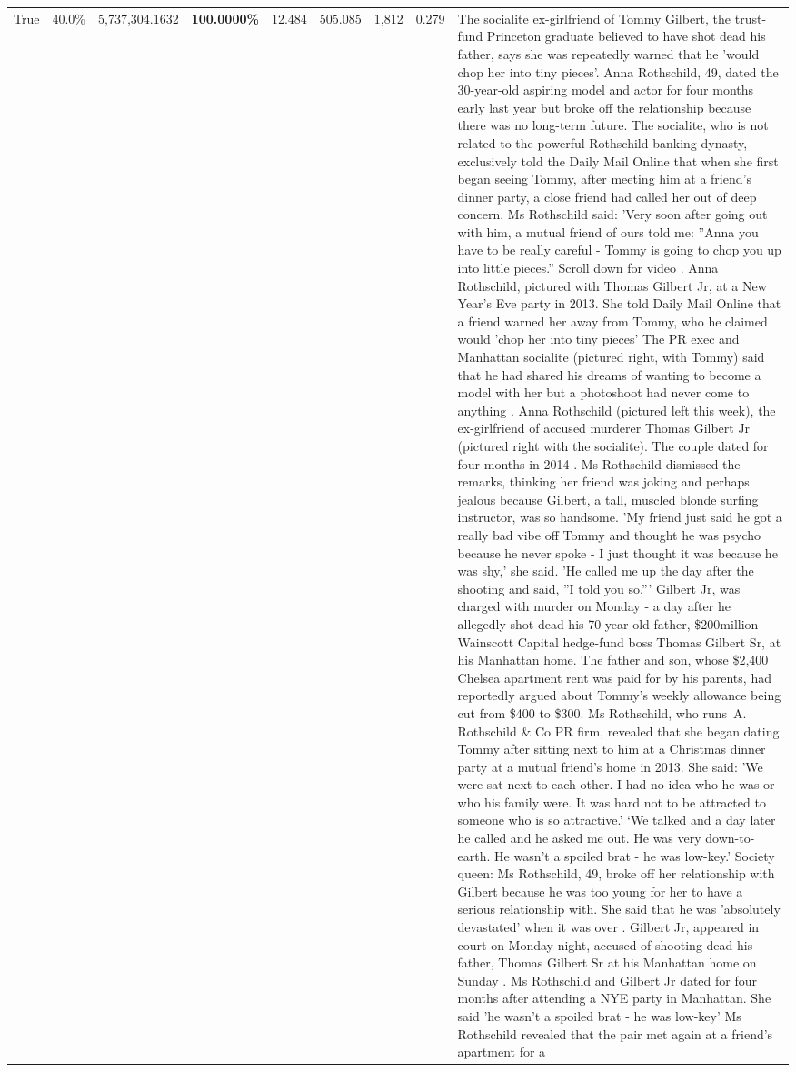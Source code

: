 \begin{table}[H]
\begin{tabular}{lllrlllll}
True & 40.0\% & 5,737,304.1632 & \bfseries \color{red} 100.0000\% & 12.484 & 505.085 & 1,812 & 0.279 & The socialite ex-girlfriend of Tommy Gilbert, the trust-fund Princeton graduate believed to have shot dead his father, says she was repeatedly warned that he 'would chop her into tiny pieces'. Anna Rothschild, 49, dated the 30-year-old aspiring model and actor for four months early last year but broke off the relationship because there was no long-term future. The socialite, who is not related to the powerful Rothschild banking dynasty, exclusively told the Daily Mail Online that when she first began seeing Tommy, after meeting him at a friend's dinner party, a close friend had called her out of deep concern. Ms Rothschild said: 'Very soon after going out with him, a mutual friend of ours told me: ''Anna you have to be really careful - Tommy is going to chop you up into little pieces.'' Scroll down for video . Anna Rothschild, pictured with Thomas Gilbert Jr, at a New Year's Eve party in 2013. She told Daily Mail Online that a friend warned her away from Tommy, who he claimed would 'chop her into tiny pieces' The PR exec and Manhattan socialite (pictured right, with Tommy) said that he had shared his dreams of wanting to become a model with her but a photoshoot had never come to anything . Anna Rothschild (pictured left this week), the ex-girlfriend of accused murderer Thomas Gilbert Jr (pictured right with the socialite). The couple dated for four months in 2014 . Ms Rothschild dismissed the remarks, thinking her friend was joking and perhaps jealous because Gilbert, a tall, muscled blonde surfing instructor, was so handsome. 'My friend just said he got a really bad vibe off Tommy and thought he was psycho because he never spoke - I just thought it was because he was shy,' she said. 'He called me up the day after the shooting and said, ''I told you so.''' Gilbert Jr, was charged with murder on Monday - a day after he allegedly shot dead his 70-year-old father, \$200million Wainscott Capital hedge-fund boss Thomas Gilbert Sr, at his Manhattan home. The father and son, whose \$2,400 Chelsea apartment rent was paid for by his parents, had reportedly argued about Tommy's weekly allowance being cut from \$400 to \$300. Ms Rothschild, who runs A. Rothschild \& Co PR firm, revealed that she began dating Tommy after sitting next to him at a Christmas dinner party at a mutual friend's home in 2013. She said: 'We were sat next to each other. I had no idea who he was or who his family were. It was hard not to be attracted to someone who is so attractive.' ‘We talked and a day later he called and he asked me out. He was very down-to-earth. He wasn’t a spoiled brat - he was low-key.’ Society queen: Ms Rothschild, 49, broke off her relationship with Gilbert because he was too young for her to have a serious relationship with. She said that he was 'absolutely devastated' when it was over . Gilbert Jr, appeared in court on Monday night, accused of shooting dead his father, Thomas Gilbert Sr at his Manhattan home on Sunday . Ms Rothschild and Gilbert Jr dated for four months after attending a NYE party in Manhattan. She said 'he wasn't a spoiled brat - he was low-key' Ms Rothschild revealed that the pair met again at a friend’s apartment for a 
\end{tabular}
\end{table}
